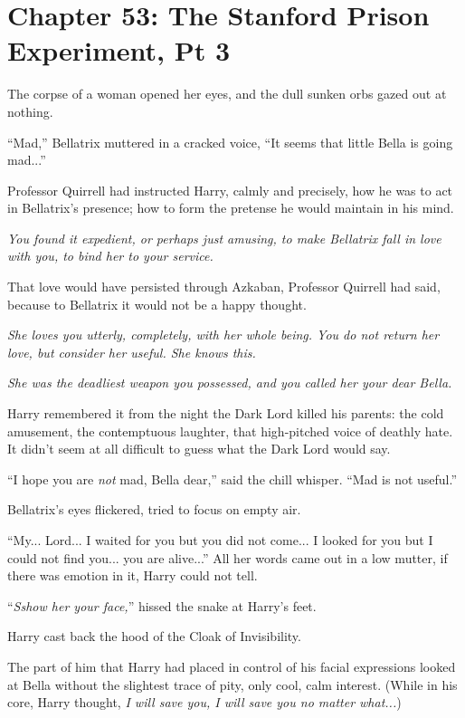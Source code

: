 \chapter{Chapter 53: The Stanford Prison Experiment, Pt 3}
The corpse of a woman opened her eyes, and the dull sunken orbs gazed out at nothing.

``Mad,'' Bellatrix muttered in a cracked voice, ``It seems that little Bella is going mad...''

Professor Quirrell had instructed Harry, calmly and precisely, how he was to act in Bellatrix's presence; how to form the pretense he would maintain in his mind.

\emph{You found it expedient, or perhaps just amusing, to make Bellatrix fall in love with you, to bind her to your service.}

That love would have persisted through Azkaban, Professor Quirrell had said, because to Bellatrix it would not be a happy thought.

\emph{She loves you utterly, completely, with her whole being. You do not return her love, but consider her useful. She knows this.}

\emph{She was the deadliest weapon you possessed, and you called her your dear Bella.}

Harry remembered it from the night the Dark Lord killed his parents: the cold amusement, the contemptuous laughter, that high-pitched voice of deathly hate. It didn't seem at all difficult to guess what the Dark Lord would say.

``I hope you are \emph{not} mad, Bella dear,'' said the chill whisper. ``Mad is not useful.''

Bellatrix's eyes flickered, tried to focus on empty air.

``My... Lord... I waited for you but you did not come... I looked for you but I could not find you... you are alive...'' All her words came out in a low mutter, if there was emotion in it, Harry could not tell.

``\emph{Sshow her your face,}'' hissed the snake at Harry's feet.

Harry cast back the hood of the Cloak of Invisibility.

The part of him that Harry had placed in control of his facial expressions looked at Bella without the slightest trace of pity, only cool, calm interest. (While in his core, Harry thought, \emph{I will save you, I will save you no matter what...})


